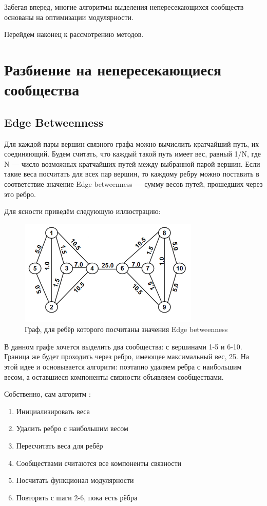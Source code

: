 \documentclass[12pt]{article}
\begin{document}
Забегая вперед, многие алгоритмы выделения непересекающихся сообществ основаны на оптимизации модулярности.

Перейдем наконец к рассмотрению методов.

\newpage

\section{Разбиение на непересекающиеся сообщества}


\subsection{Edge Betweenness}
\label{sec:edge_betweenness}

Для каждой пары вершин связного графа можно вычислить кратчайший путь, их соединяющий. Будем считать, что каждый такой путь имеет вес, равный 1/N, где N --- число возможных кратчайших путей между выбранной парой вершин. Если такие веса посчитать для всех пар вершин, то каждому ребру можно поставить в соответствие значение Edge betweenness --- сумму весов путей, прошедших через это ребро.

Для ясности приведём следующую иллюстрацию:
\begin{figure}[h]
	\begin{center}
		\includegraphics[scale=0.6]{pics/edge_betweenness_1}
	\end{center}
	\caption{Граф, для ребёр которого посчитаны значения Edge betweenness}
\end{figure}


В данном графе хочется выделить два сообщества: с вершинами 1-5 и 6-10. Граница же будет проходить через ребро, имеющее максимальный вес, 25. На этой идее и основывается алгоритм: поэтапно удаляем ребра с наибольшим весом, а оставшиеся компоненты связности объявляем сообществами.

Собственно, сам алгоритм \cite{edge_betweenness}:
\begin{enumerate}
\item Инициализировать веса
\item Удалить ребро с наибольшим весом
\item Пересчитать веса для ребёр
\item Сообществами считаются все компоненты связности
\item Посчитать функционал модулярности
\item Повторять с шаги 2-6, пока есть рёбра
\end{enumerate}
\end{document}

